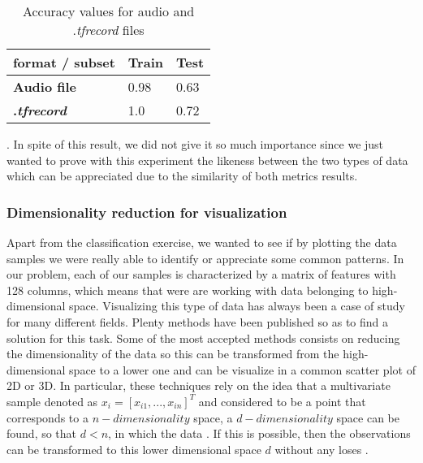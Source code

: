 	\begin{table}[h]
	\begin{center}
		\centering
		\begin{tabular}{|| m{7em} | m{7em} | m{7em} ||}
			\hline
			format / subset & \textbf{Train} & \textbf{Test} \\
			\hline\hline
			\textbf{Audio file} & 0.98 & 0.63 \\
			\hline
			\textbf{.\textit{tfrecord}} & 1.0 & 0.72 \\
			\hline
		\end{tabular}
	\end{center}
	\caption{Accuracy values for audio and .\textit{tfrecord} files}
	\label{table:5}
	\end{table}

	. In spite of this result, we did not give it so much importance since we just wanted to prove with this experiment the likeness between the two types of data which can be appreciated due to the similarity of both metrics results.
	
\subsubsection{Dimensionality reduction for visualization}
\label{subsection:dimensionality-reduction-for-visualization}
	
	Apart from the classification exercise, we wanted to see if by plotting the data samples we were really able to identify or appreciate some common patterns. In our problem, each of our samples is characterized by a matrix of features with 128 columns, which means that were are working with data belonging to high-dimensional space. Visualizing this type of data has always been a case of study for many different fields. Plenty methods have been published so as to find a solution for this task. Some of the most accepted methods consists on reducing the dimensionality of the data so this can be transformed from the high-dimensional space to a lower one and can be visualize in a common scatter plot of 2D or 3D. In particular, these techniques rely on the idea that a multivariate sample denoted as $x_i = [x_{i1},..., x_{in}]^T$ and considered to be a point that corresponds to a $n-dimensionality$ space, a $d-dimensionality$ space can be found, so that $d < n$, in which the data . If this is possible, then the observations can be transformed to this lower dimensional space $d$ without any loses \cite{Kaski2011}. 
	
